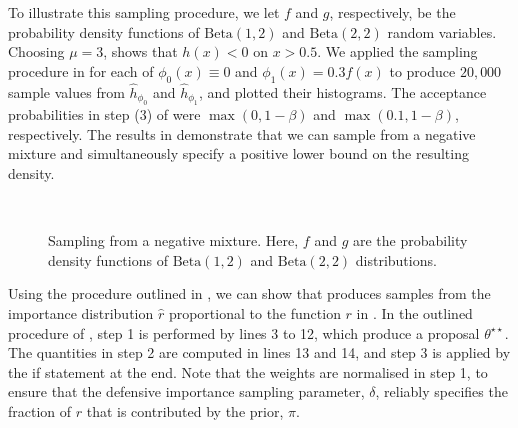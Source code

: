 \documentclass[review,demo]{siamonline190516}
\begin{document}
To illustrate this sampling procedure, we let $f$ and $g$, respectively, be the probability density functions of $\mathrm{Beta}(1,2)$ and $\mathrm{Beta}(2,2)$ random variables.
Choosing $\mu = 3$,  shows that $h(x)<0$ on $x>0.5$.
We applied the sampling procedure in  for each of $\phi_0(x) \equiv 0$ and $\phi_1(x) = 0.3f(x)$ to produce $20,000$ sample values from $\hat h_{\phi_0}$ and $\hat h_{\phi_1}$, and plotted their histograms.
The acceptance probabilities in step (3) of  were $\max(0, 1-\beta)$ and $\max(0.1, 1 - \beta)$, respectively.
The results in  demonstrate that we can sample from a negative mixture and simultaneously specify a positive lower bound on the resulting density.

\begin{figure}
    \centering
    ~
    \caption{Sampling from a negative mixture. Here, $f$ and $g$ are the probability density functions of $\mathrm{Beta}(1,2)$ and $\mathrm{Beta}(2,2)$ distributions.}
    \label{fig:negative_mixture}
\end{figure}

Using the procedure outlined in , we can show that  produces samples from the importance distribution $\hat r$ proportional to the function $r$ in .
In the outlined procedure of , step 1 is performed by lines 3 to 12, which produce a proposal $\theta^{\star \star}$.
The quantities in step 2 are computed in lines 13 and 14, and step 3 is applied by the if statement at the end.
Note that the weights are normalised in step 1, to ensure that the defensive importance sampling parameter, $\delta$, reliably specifies the fraction of $r$ that is contributed by the prior, $\pi$.
\end{document}
